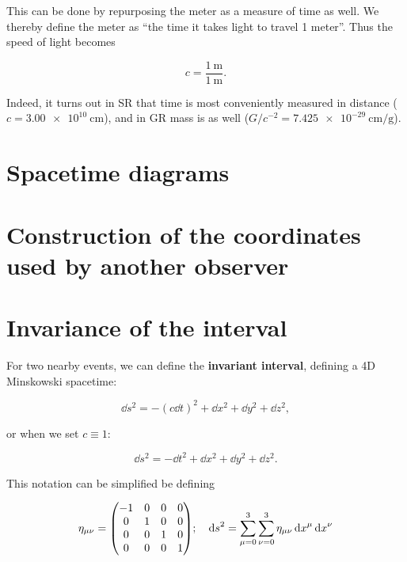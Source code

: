 \documentclass[gr-notes.tex]{subfiles}
\begin{document}
This can be done by repurposing the meter as a measure of time as well. We thereby define the meter as ``the time it takes light to travel 1 meter''. Thus the speed of light becomes

\begin{displaymath}
  c = \frac{\SI{1}{\meter}}{\SI{1}{\meter}}.
\end{displaymath}

Indeed, it turns out in SR that time is most conveniently measured in distance ($c = \SI{3.00e10}{\centi\meter}$), and in GR mass is as well ($G/c^{-2} = \SI{7.425e-29}{\centi\meter\per\gram}$).


\section{Spacetime diagrams}

\section{Construction of the coordinates used by another observer}

\section{Invariance of the interval}

For two nearby events, we can define the \textbf{invariant interval}, defining a 4D Minskowski spacetime:

\begin{displaymath}
  \dd{s}^2 = -(c \dd{t})^2 + \dd{x}^2 + \dd{y}^2 + \dd{z}^2,
\end{displaymath}

or when we set $c \equiv 1$:

\begin{displaymath}
  \dd{s}^2 = -\dd{t}^2 + \dd{x}^2 + \dd{y}^2 + \dd{z}^2.
\end{displaymath}

This notation can be simplified be defining

\begin{displaymath}
  \eta_{\mu\nu} =
  \mqty(-1 & 0 & 0 & 0 \\
         0 & 1 & 0 & 0 \\
         0 & 0 & 1 & 0 \\
         0 & 0 & 0 & 1);
  \quad
  \dd{s}^2 = \sum_{\mu=0}^3 \sum_{\nu=0}^3 \eta_{\mu\nu} \dd{x}^\mu \dd{x}^\nu
\end{displaymath}
\end{document}
